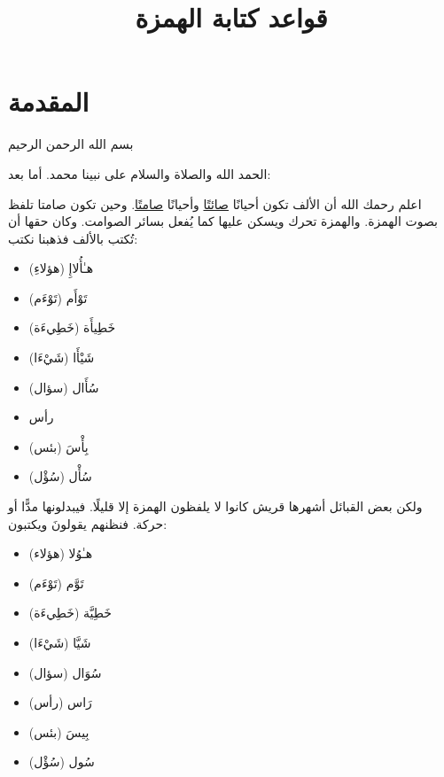 \documentclass[
  english,
  10pt,
]{article}
\title{\foreignlanguage{arabic}{\altfamily قواعد كتابة الهمزة}}
\author{}
\date{}
\providecommand{\tightlist}{%
  \setlength{\itemsep}{0pt}\setlength{\parskip}{0pt}}
\renewcommand*\contentsname{Table of contents}
\newcommand\contentsname{Table of contents}
\begin{document}
\maketitle

\renewcommand*\contentsname{Table of contents}
{
\setcounter{tocdepth}{3}
\tableofcontents
}

\section{\texorpdfstring{\foreignlanguage{arabic}{\altfamily المقدمة}}{المقدمة}}\label{ux627ux644ux645ux642ux62fux645ux629}

\begin{otherlanguage}{arabic}

\altfamily 

بسم الله الرحمن الرحيم

الحمد الله والصلاة والسلام على نبينا محمد. أما بعد:

اعلم رحمك الله أن الألف تكون أحيانًا
\href{https://ar.wikipedia.org/wiki/\%D8\%B5\%D8\%A7\%D8\%A6\%D8\%AA}{صائتًا}
وأحيانًا
\href{https://ar.wikipedia.org/wiki/\%D8\%B5\%D8\%A7\%D9\%85\%D8\%AA}{صامتًا}.
وحين تكون صامتا تلفظ بصوت الهمزة. والهمزة تحرك ويسكن عليها كما يُفعل
بسائر الصوامت. وكان حقها أن تُكتب بالألف فذهبنا نكتب:

\begin{itemize}
\tightlist
\item
  هـٰأُلاإِ (هؤلاءِ)
\item
  تَوْأَم (تَوْءَم)
\item
  خَطِيأَة (خَطِيءَة)
\item
  شَيْأَا (شَيْءَا)
\item
  سُأَال (سؤال)
\item
  رأس
\item
  بِأْسَ (بئس)
\item
  سُأْل (سُؤْل)
\end{itemize}

ولكن بعض القبائل أشهرها قريش كانوا لا يلفظون الهمزة إلا قليلًا. فيبدلونها
مدًّا أو حركة. فنظنهم يقولونَ ويكتبون:

\begin{itemize}
\tightlist
\item
  هـٰوُلا (هؤلاء)
\item
  تَوَّم (تَوْءَم)
\item
  خَطِيَّة (خَطِيءَة)
\item
  شَيَّا (شَيْءَا)
\item
  سُوَال (سؤال)
\item
  رَاس (رأس)
\item
  بِيسَ (بئس)
\item
  سُول (سُؤْل)
\end{itemize}


\end{otherlanguage}
\end{document}
